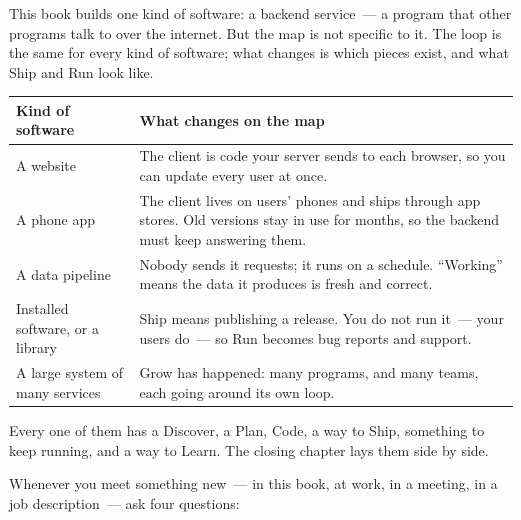 \label{how-software-gets-built:the-same-map-for-any-application}

This book builds one kind of software: a backend service~--- a program that other programs talk to over the internet. But the map is not specific to it. The loop is the same for every kind of software; what changes is which pieces exist, and what Ship and Run look like.


{\def\LTcaptype{none} %
\begin{longtable}[]{@{}
  >{\raggedright\arraybackslash}p{}
  >{\raggedright\arraybackslash}p{}@{}}
\toprule\noalign{}
\begin{minipage}[b]{\linewidth}\raggedright
Kind of software
\end{minipage} & \begin{minipage}[b]{\linewidth}\raggedright
What changes on the map
\end{minipage} \\
\midrule\noalign{}
\endhead
\bottomrule\noalign{}
\endlastfoot
A website & The client is code your server sends to each browser, so you can update every user at once. \\
A phone app & The client lives on users' phones and ships through app stores. Old versions stay in use for months, so the backend must keep answering them. \\
A data pipeline & Nobody sends it requests; it runs on a schedule. ``Working'' means the data it produces is fresh and correct. \\
Installed software, or a library & Ship means publishing a release. You do not run it~--- your users do~--- so Run becomes bug reports and support. \\
A large system of many services & Grow has happened: many programs, and many teams, each going around its own loop. \\
\end{longtable}
}

Every one of them has a Discover, a Plan, Code, a way to Ship, something to keep running, and a way to Learn. The closing chapter lays them side by side.

\label{how-software-gets-built:how-to-use-the-map}

Whenever you meet something new~--- in this book, at work, in a meeting, in a job description~--- ask four questions:

